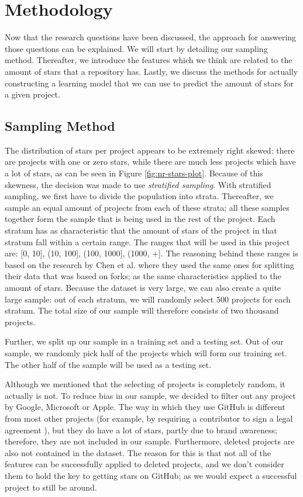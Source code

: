 \section{Methodology}
\label{sec:methodology}
    Now that the research questions have been discussed, the approach for answering those questions can be explained.
    We will start by detailing our sampling method. 
    Thereafter, we introduce the features which we think are related to the amount of stars that a repository has.
    Lastly, we discuss the methods for actually constructing a learning model that we can use to predict the amount of stars for a given project.
    \subsection{Sampling Method}
        The distribution of stars per project appears to be extremely right skewed: there are projects with one or zero stars, while there are much less projects which have a lot of stars, as can be seen in Figure \ref{fig:nr-stars-plot}.
        Because of this skewness, the decision was made to use \textit{stratified sampling}\cite{trost-1986}.
        With stratified sampling, we first have to divide the population into strata. 
        Thereafter, we sample an equal amount of projects from each of these strata; 
        all these samples together form the sample that is being used in the rest of the project.
        Each stratum has as characteristic that the amount of stars of the project in that stratum fall within a certain range. 
        The ranges that will be used in this project are: [0, 10], (10, 100], (100, 1000], (1000, +].
        The reasoning behind these ranges is based on the research by Chen et al. where they used the same ones for splitting their data that was based on forks; as the same characteristics applied to the amount of stars. \cite{chen-2014}
        Because the dataset is very large, we can also create a quite large sample:         
        out of each stratum, we will randomly select 500 projects for each stratum. The total size of our sample will therefore consists of two thousand projects.
        
        Further, we split up our sample in a training set and a testing set. Out of our sample, we randomly pick half of the projects which will form our training set. The other half of the sample will be used as a testing set.
        
        Although we mentioned that the selecting of projects is completely random, it actually is not. To reduce bias in our sample, we decided to filter out any project by Google, Microsoft or Apple.
        The way in which they use GitHub is different from most other projects (for example, by requiring a contributor to sign a legal agreement \cite{google-contributing-guidelines-2015}), but they do have a lot of stars, partly due to brand awareness;  therefore, they are not included in our sample.
        Furthermore, deleted projects are also not contained in the dataset.
        The reason for this is that not all of the features can be successfully applied to deleted projects, and we don't consider them to hold the key to getting stars on GitHub; as we would expect a successful project to still be around.
        
